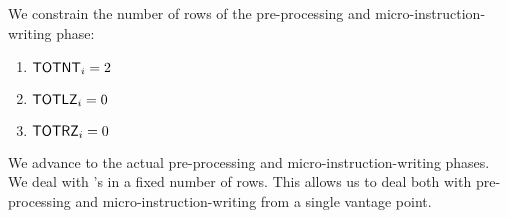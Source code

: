 \begin{center}
\end{center}
We constrain the number of rows of the pre-processing and micro-instruction-writing phase:
\begin{enumerate}
	\item $\textsf{TOTNT}_{i} = 2$
	\item $\textsf{TOTLZ}_{i} = 0$
	\item $\textsf{TOTRZ}_{i} = 0$
\end{enumerate}
We advance to the actual pre-processing and micro-instruction-writing phases.
We deal with \mmuInstMstore{}'s in a fixed number of rows.
This allows us to deal both with pre-processing and micro-instruction-writing from a single vantage point. 
